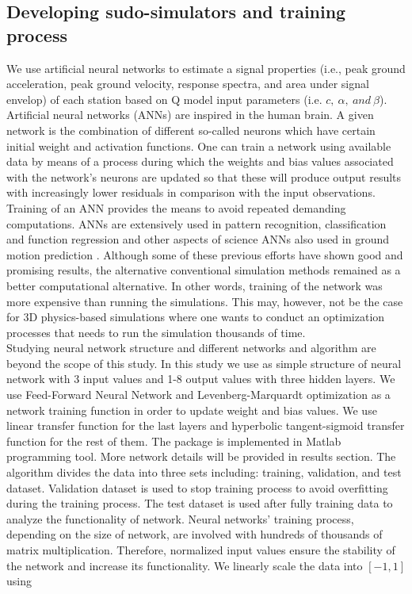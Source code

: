 \subsection{Developing sudo-simulators and training process}

We use artificial neural networks to estimate a signal properties (i.e., peak ground acceleration, peak ground velocity, response spectra, and area under signal envelop) of each station based on Q model input parameters (i.e. $c,~\alpha,~and~\beta$). Artificial neural networks (ANNs) are inspired in the human brain. A given network is the combination of different so-called neurons which have certain initial weight and activation functions. One can train a network using available data by means of a process during which the weights and bias values associated with the network's neurons are updated so that these will produce output results with increasingly lower residuals in comparison with the input observations.  Training of an ANN provides the means to avoid repeated demanding computations. ANNs are extensively used in pattern recognition, classification and function regression and other aspects of science \citep[][.] {Hinton2012deep,Baughman2014neural,Graves2013speech,Dahl2012context,Toshev2014deeppose}
ANNs also used in  ground motion prediction \citep{Hong2012observations,Ghaffarzadeh2013neural,paolucci2018broad}. Although some of these previous efforts have shown good and promising results, the alternative conventional simulation methods remained as a better computational alternative. In other words, training of the network was more expensive than running the simulations. This may, however, not be the case for 3D physics-based simulations where one wants to conduct an optimization processes that needs to run the simulation thousands of time.\\
Studying neural network structure and different networks and algorithm are beyond the scope of this study.  In this study we use as simple structure of neural network with 3 input values and 1-8 output values with three hidden layers. We use Feed-Forward Neural Network and Levenberg-Marquardt optimization as a network training function in order to update weight and bias values. We use linear transfer function for the last layers and hyperbolic tangent-sigmoid transfer function for the rest of them. The package is implemented in Matlab programming tool. More network details will be provided in results section. The algorithm divides the data into three sets including: training, validation, and test dataset. Validation dataset is used to stop training process to avoid overfitting during the training process. The test dataset is used after fully training data to analyze the functionality of network. Neural networks' training process, depending on the size of network, are involved with hundreds of thousands of matrix multiplication. Therefore, normalized input values ensure the stability of the network and increase its functionality. We linearly scale the data into $[-1,1]$ using

